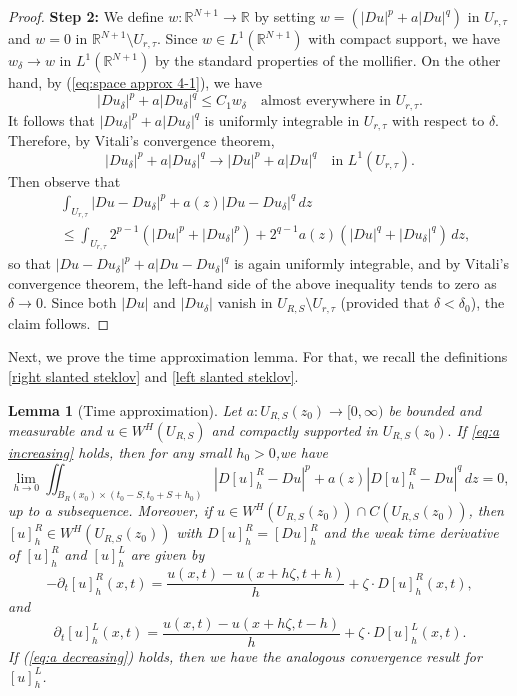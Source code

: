 \documentclass[notitlepage,11pt,reqno]{amsart}
\newtheorem{lemma}[theorem]{Lemma}
\theoremstyle{definition}
\numberwithin{equation}{section}
\newcommand{\RR}{\mathds{R}}
\begin{document}
\begin{proof}
\textbf{Step 2:} We define $w:\RR^{N+1}\rightarrow\RR$
by setting $w=(\left|Du\right|^{p}+a\left|Du\right|^{q})$ in $U_{r, \tau}$
and $w=0$ in $\RR^{N+1}\setminus U_{r, \tau}.$ Since $w\in L^{1}(\RR^{N+1})$
with compact support, we have $w_{\delta}\rightarrow w$ in $L^{1}(\RR^{N+1})$
by the standard properties of the mollifier. On the other hand, by (\ref{eq:space approx 4-1}),
we have
\[
\left|Du_{\delta}\right|^{p}+a\left|Du_{\delta}\right|^{q}\leq C_{1}w_{\delta}\quad\text{almost everywhere in }U_{r, \tau}.
\]
It follows that $\left|Du_{\delta}\right|^{p}+a\left|Du_{\delta}\right|^{q}$
is uniformly integrable in $U_{r, \tau}$ with respect to $\delta$.
Therefore, by Vitali's convergence theorem, 
\[
\left|Du_{\delta}\right|^{p}+a\left|Du_{\delta}\right|^{q}\rightarrow\left|Du\right|^{p}+a\left|Du\right|^{q}\quad\text{in }L^{1}(U_{r, \tau}).
\]
Then observe that
\begin{align*}
 & \int_{U_{r, \tau}}\left|Du-Du_{\delta}\right|^{p}+a(z)\left|Du-Du_{\delta}\right|^{q}\, d z\\
 & \leq\int_{U_{r, \tau}}2^{p-1}(\left|Du\right|^{p}+\left|Du_{\delta}\right|^{p})+2^{q-1}a(z)(\left|Du\right|^{q}+\left|Du_{\delta}\right|^{q})\, d z,
\end{align*}
so that $\left|Du-Du_{\delta}\right|^{p}+a\left|Du-Du_{\delta}\right|^{q}$
is again uniformly integrable, and by Vitali's convergence theorem,
the left-hand side of the above inequality tends to zero as $\delta\rightarrow0$.
Since both $\left|Du\right|$ and $\left|Du_{\delta}\right|$ vanish
in $U_{R, S}\setminus U_{r, \tau}$ (provided that $\delta<\delta_{0}$),
the claim follows.
\end{proof}
Next, we prove the time approximation lemma. For that, we recall the definitions \eqref{right slanted steklov} and \eqref{left slanted steklov}.
\begin{lemma}[Time approximation]\label{lem:steklov lemma}
Let $a:U_{R, S}(z_0) \rightarrow [0,\infty)$ be bounded and measurable and $u \in W^H(U_{R, S})$ and compactly supported in $U_{R, S}(z_0).$ If \eqref{eq:a increasing} holds, then for any small $h_{0}>0$,we have
\[
\lim_{h\rightarrow0}\iint_{B_{R}(x_0)\times (t_0-S, t_0+S+h_0)}\left|D[u]^R_h-Du \right|^p+a(z)\left|D[u]^R_h-Du\right|^{q} \, dz =0,
\] up to a subsequence.
Moreover, if $u\in W^{H}(U_{R, S}(z_0))\cap C(U_{R, S}(z_0))$, then $[u]_{h}^{R}\in W^{H}(U_{R, S}(z_0))$
with $D[u]_{h}^{R}=[Du]_{h}^{R}$ and the weak time
derivative of $[u]_{h}^{R}$ and $[u]^L_{h}$ are given by
\[
-\partial_{t}[u]_{h}^{R}(x,t)=\frac{u(x, t)-u(x+h\zeta,t+h)}{h}+\zeta\cdot D[u]_{h}^{R}(x,t),
\]
and
\[\partial_{t}[u]_{h}^{L}(x,t)=\frac{u(x, t)-u(x+h\zeta,t-h)}{h}+\zeta\cdot D[u]_{h}^{L}(x,t).\]
If (\ref{eq:a decreasing}) holds, then we have the analogous convergence result for $[u]^{L}_h$.
\end{lemma}
\end{document}
